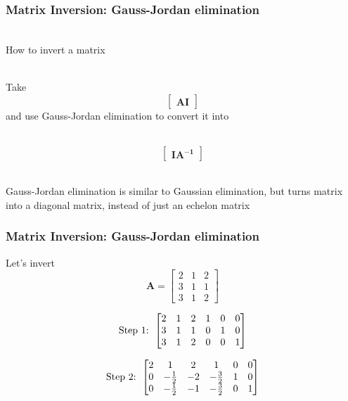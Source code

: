 \documentclass[handout]{beamer}
\numberwithin{equation}{section}
\begin{document}
\begin{frame}
\frametitle{Matrix Inversion: Gauss-Jordan elimination}

\ \\How to invert a matrix \pause

\ \\Take $$\begin{bmatrix}\mathbf{A I} \end{bmatrix}$$ and use Gauss-Jordan elimination to convert it into

\ \\$$\begin{bmatrix}\mathbf{I A^{-1}} \end{bmatrix}$$ \pause

\ \\Gauss-Jordan elimination is similar to Gaussian elimination, but turns matrix into a diagonal matrix, instead of just an echelon matrix
\end{frame}



\begin{frame}
\frametitle{Matrix Inversion: Gauss-Jordan elimination}

Let's invert $$\mathbf{A}=\begin{bmatrix}
2&1&2\\
3&1&1\\
3&1&2
\end{bmatrix}$$ \pause

$$\hbox{Step 1: }\begin{bmatrix}
2&1&2& 1& 0& 0\\
3&1&1& 0& 1& 0\\
3&1&2& 0& 0&1
\end{bmatrix}$$ \pause

$$\hbox{Step 2: }\begin{bmatrix}
2&1&2& 1& 0& 0\\
0&- \frac{1}{2} &-2& -\frac{3}{2}&1 & 0\\

0&- \frac{1}{2} &-1& -\frac{3}{2}& 0&1
\end{bmatrix}$$

\end{frame}
\end{document}
